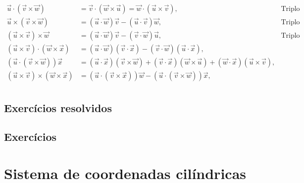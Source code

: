\begin{subequations}\label{vectoridendities}
\begin{align}
 \vec{u}\cdot\left(\vec{v}\times\vec{w}\right)&=\vec{v}\cdot\left(\vec{w}\times\vec{u}\right)=\vec{w}\cdot\left(\vec{u}\times\vec{v}\right),&\text{Triplo produto escalar}\\
 \vec{u}\times\left(\vec{v}\times\vec{w}\right)&=\left(\vec{u}\cdot\vec{w}\right)\vec{v}-\left(\vec{u}\cdot\vec{v}\right)\vec{w},&\text{Triplo produto vetorial} \\
 \left(\vec{u}\times\vec{v}\right)\times\vec{w}&=\left(\vec{u}\cdot\vec{w}\right)\vec{v}-\left(\vec{v}\cdot\vec{w}\right)\vec{u},&\text{Triplo produto vetorial} \\
 \left(\vec{u}\times\vec{v}\right)\cdot\left(\vec{w}\times\vec{x}\right)&=\left(\vec{u}\cdot\vec{w}\right)\left(\vec{v}\cdot\vec{x}\right)-\left(\vec{v}\cdot\vec{w}\right)\left(\vec{u}\cdot\vec{x}\right),& \\
\left(\vec{u}\cdot\left(\vec{v}\times\vec{w}\right)\right)\vec{x}&=\left(\vec{u}\cdot\vec{x}\right)\left(\vec{v}\times\vec{w}\right)+\left(\vec{v}\cdot\vec{x}\right)\left(\vec{w}\times\vec{u}\right)+\left(\vec{w}\cdot\vec{x}\right)\left(\vec{u}\times\vec{v}\right),& \\
\left(\vec{u}\times\vec{v}\right)\times\left(\vec{w}\times\vec{x}\right)
&=\left(\vec{u}\cdot\left(\vec{v}\times\vec{x}\right)\right)\vec{w}-\left(\vec{u}\cdot\left(\vec{v}\times\vec{w}\right)\right)\vec{x},&\\
\end{align}
\end{subequations}

\subsection*{Exercícios resolvidos}

\construirExeresol

\subsection*{Exercícios}

\construirExer



\section{Sistema de coordenadas cilíndricas}

